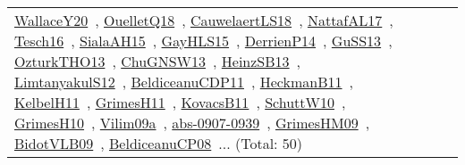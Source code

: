 {\begin{longtable}{lp{3cm}>{\raggedright\arraybackslash}p{6cm}>{\raggedright\arraybackslash}p{6cm}>{\raggedright\arraybackslash}p{8cm}}
\href{works/WallaceY20.pdf}{WallaceY20}~\cite{WallaceY20}, \href{works/OuelletQ18.pdf}{OuelletQ18}~\cite{OuelletQ18}, \href{works/CauwelaertLS18.pdf}{CauwelaertLS18}~\cite{CauwelaertLS18}, \href{works/NattafAL17.pdf}{NattafAL17}~\cite{NattafAL17}, \href{works/Tesch16.pdf}{Tesch16}~\cite{Tesch16}, \href{works/SialaAH15.pdf}{SialaAH15}~\cite{SialaAH15}, \href{works/GayHLS15.pdf}{GayHLS15}~\cite{GayHLS15}, \href{works/DerrienP14.pdf}{DerrienP14}~\cite{DerrienP14}, \href{works/GuSS13.pdf}{GuSS13}~\cite{GuSS13}, \href{works/OzturkTHO13.pdf}{OzturkTHO13}~\cite{OzturkTHO13}, \href{works/ChuGNSW13.pdf}{ChuGNSW13}~\cite{ChuGNSW13}, \href{works/HeinzSB13.pdf}{HeinzSB13}~\cite{HeinzSB13}, \href{works/LimtanyakulS12.pdf}{LimtanyakulS12}~\cite{LimtanyakulS12}, \href{works/BeldiceanuCDP11.pdf}{BeldiceanuCDP11}~\cite{BeldiceanuCDP11}, \href{works/HeckmanB11.pdf}{HeckmanB11}~\cite{HeckmanB11}, \href{works/KelbelH11.pdf}{KelbelH11}~\cite{KelbelH11}, \href{works/GrimesH11.pdf}{GrimesH11}~\cite{GrimesH11}, \href{works/KovacsB11.pdf}{KovacsB11}~\cite{KovacsB11}, \href{works/SchuttW10.pdf}{SchuttW10}~\cite{SchuttW10}, \href{works/GrimesH10.pdf}{GrimesH10}~\cite{GrimesH10}, \href{works/Vilim09a.pdf}{Vilim09a}~\cite{Vilim09a}, \href{works/abs-0907-0939.pdf}{abs-0907-0939}~\cite{abs-0907-0939}, \href{works/GrimesHM09.pdf}{GrimesHM09}~\cite{GrimesHM09}, \href{works/BidotVLB09.pdf}{BidotVLB09}~\cite{BidotVLB09}, \href{works/BeldiceanuCP08.pdf}{BeldiceanuCP08}~\cite{BeldiceanuCP08}... (Total: 50)\\

\end{longtable}}
